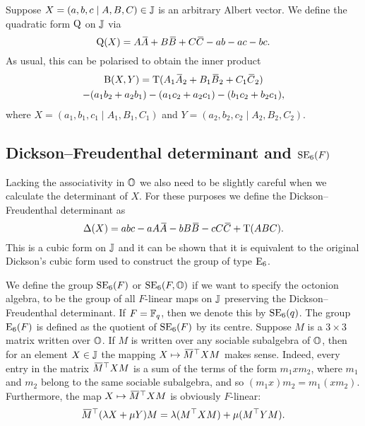 Suppose $X = (a,b,c \mid A,B,C) \in \mathbb{J}$ is an arbitrary Albert vector. We define
the quadratic form $\mathord{\mathrm{Q}}$ on $\mathbb{J}$ via
\begin{equation}
	\label{eq:qform_on_J}
	\QQ(X) = A\ovA + B\ovB + C\ovC - ab - ac - bc.
\end{equation}
As usual, this can be polarised to obtain the inner product
\begin{multline}
	\label{eq:inner_product_in_J}
	\BB(X,Y) = \Tr( A_1 \ovA_2 + B_1 \ovB_2 + C_1 \ovC_2 ) \\
		- (a_1 b_2 + a_2 b_1) - (a_1 c_2 + a_2 c_1) - (b_1 c_2 + b_2 c_1),
\end{multline}
where $X = (a_1, b_1, c_1 \mid A_1, B_1, C_1)$ and $Y = (a_2, b_2, c_2 \mid A_2, B_2, C_2 )$.


\subsection{Dickson--Freudenthal determinant and $\mathrm{SE}_6(F)$}

Lacking the associativity in $\mathbb{O}$ we also need to be slightly careful when we calculate
the determinant of $X$. For these purposes we define the Dickson--Freudenthal determinant
as
\begin{equation}
	\fdet(X) = abc - aA\ovA - bB\ovB - cC\ovC + \Tr(ABC).
\end{equation}
This is a cubic form on $\mathbb{J}$ and it can be shown that it is equivalent to the 
original Dickson's cubic form \cite{Dickson1} used to construct the group of type $\mathrm{E}_6$. 

We define the group $\mathrm{SE}_6(F)$ or $\mathrm{SE}_6(F,\mathbb{O})$ if we want to specify the octonion 
algebra, to be the group of all $F$-linear maps on $\mathbb{J}$ preserving
 the Dickson--Freudenthal determinant. If $F = \mathbb{F}_q$, then we denote this by $\mathrm{SE}_6(q)$.
  The group $\mathord{\mathrm{E}}_6(F)$ is defined as the quotient
 of $\mathrm{SE}_6(F)$ by its centre.
Suppose $M$ is a $3\times 3$ matrix written over $\mathbb{O}$. If $M$ is written over any 
sociable subalgebra of $\mathbb{O}$, then for an element $X \in \mathbb{J}$ the mapping 
$X \mapsto \mathord{\mbox{\hspace*{0pt}}\,\overline{\!M\!\!\;}\!\:}\mbox{\hspace*{0pt}}^{\top} X M$ makes sense. Indeed, every entry in the matrix $\mathord{\mbox{\hspace*{0pt}}\,\overline{\!M\!\!\;}\!\:}\mbox{\hspace*{0pt}}^{\top} X M$
is a sum of the terms of the form $m_1 x m_2$, where $m_1$ and $m_2$ belong to the same
sociable subalgebra, and so $(m_1 x) m_2 = m_1 (x m_2)$. Furthermore, the map
$X \mapsto \mathord{\mbox{\hspace*{0pt}}\,\overline{\!M\!\!\;}\!\:}\mbox{\hspace*{0pt}}^{\top} X M$ is obviously $F$-linear:
\begin{equation}
	\mathord{\mbox{\hspace*{0pt}}\,\overline{\!M\!\!\;}\!\:}\mbox{\hspace*{0pt}}^{\top} (\lambda X + \mu Y) M = \lambda (  M^{\top} X M ) + \mu ( M^{\top} Y M ).
\end{equation}


